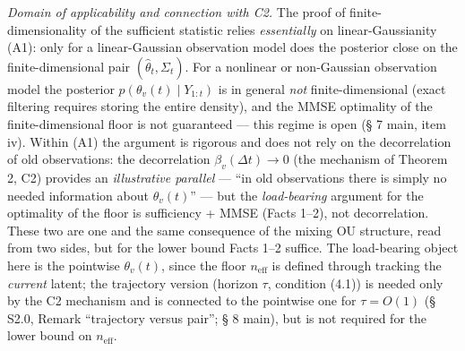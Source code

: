 \documentclass[12pt]{iopart}
\begin{document}
\emph{Domain of applicability and connection with C2.} The proof of finite-dimensionality of the sufficient statistic relies \emph{essentially} on linear-Gaussianity (A1): only for a linear-Gaussian observation model does the posterior close on the finite-dimensional pair \((\hat\theta_t,\Sigma_t)\). For a nonlinear or non-Gaussian observation model the posterior \(p(\theta_v(t)\mid Y_{1:t})\) is in general \emph{not} finite-dimensional (exact filtering requires storing the entire density), and the MMSE optimality of the finite-dimensional floor is not guaranteed --- this regime is open (§ 7 main, item iv). Within (A1) the argument is rigorous and does not rely on the decorrelation of old observations: the decorrelation \(\beta_v(\Delta t)\to 0\) (the mechanism of Theorem 2, C2) provides an \emph{illustrative parallel} --- ``in old observations there is simply no needed information about \(\theta_v(t)\)'' --- but the \emph{load-bearing} argument for the optimality of the floor is sufficiency + MMSE (Facts 1--2), not decorrelation. These two are one and the same consequence of the mixing OU structure, read from two sides, but for the lower bound Facts 1--2 suffice. The load-bearing object here is the pointwise \(\theta_v(t)\), since the floor \(n_{\text{eff}}\) is defined through tracking the \emph{current} latent; the trajectory version (horizon \(\tau\), condition (4.1)) is needed only by the C2 mechanism and is connected to the pointwise one for \(\tau=O(1)\) (§ S2.0, Remark ``trajectory versus pair''; § 8 main), but is not required for the lower bound on \(n_{\text{eff}}\).
\end{document}
